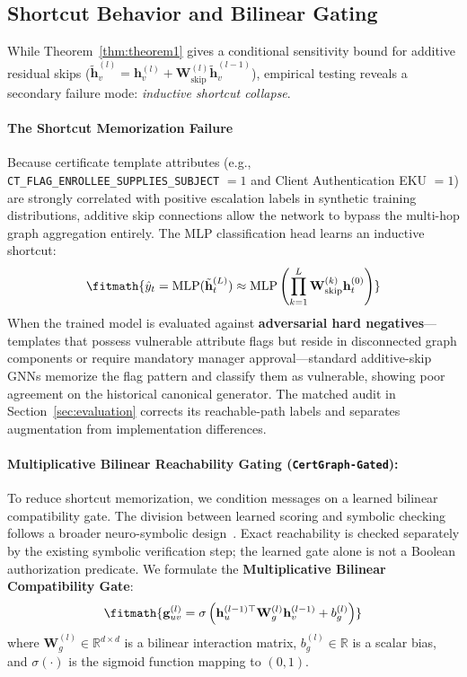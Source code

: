 \subsection{Shortcut Behavior and Bilinear Gating}
While Theorem~\ref{thm:theorem1} gives a conditional sensitivity bound for additive residual skips ($\tilde{\mathbf{h}}_v^{(l)} = \mathbf{h}_v^{(l)} + \mathbf{W}_{\text{skip}}^{(l)} \tilde{\mathbf{h}}_v^{(l-1)}$), empirical testing reveals a secondary failure mode: \textit{inductive shortcut collapse}.

\paragraph{The Shortcut Memorization Failure}
Because certificate template attributes (e.g., \texttt{CT\_FLAG\_ENROLLEE\_SUPPLIES\_SUBJECT} $= 1$ and Client Authentication EKU $= 1$) are strongly correlated with positive escalation labels in synthetic training distributions, additive skip connections allow the network to bypass the multi-hop graph aggregation entirely. The MLP classification head learns an inductive shortcut:
\begin{equation}
\fitmath{\hat{y}_t = \text{MLP}(\tilde{\mathbf{h}}_t^{(L)}) \approx \text{MLP} \left( \prod_{k=1}^L \mathbf{W}_{\text{skip}}^{(k)} \mathbf{h}_t^{(0)} \right)}
\end{equation}
When the trained model is evaluated against \textbf{adversarial hard negatives}—templates that possess vulnerable attribute flags but reside in disconnected graph components or require mandatory manager approval—standard additive-skip GNNs memorize the flag pattern and classify them as vulnerable, showing poor agreement on the historical canonical generator. The matched audit in Section~\ref{sec:evaluation} corrects its reachable-path labels and separates augmentation from implementation differences.

\paragraph{Multiplicative Bilinear Reachability Gating (\texttt{CertGraph-Gated}):}
To reduce shortcut memorization, we condition messages on a learned bilinear compatibility gate. The division between learned scoring and symbolic checking follows a broader neuro-symbolic design~\cite{garcez2023neurosymbolic}. Exact reachability is checked separately by the existing symbolic verification step; the learned gate alone is not a Boolean authorization predicate. We formulate the \textbf{Multiplicative Bilinear Compatibility Gate}:
\begin{equation}
\fitmath{\mathbf{g}_{uv}^{(l)} = \sigma \left( \mathbf{h}_u^{(l-1)\top} \mathbf{W}_g^{(l)} \mathbf{h}_v^{(l-1)} + b_g^{(l)} \right)}
\end{equation}
where $\mathbf{W}_g^{(l)} \in \mathbb{R}^{d \times d}$ is a bilinear interaction matrix, $b_g^{(l)} \in \mathbb{R}$ is a scalar bias, and $\sigma(\cdot)$ is the sigmoid function mapping to $(0, 1)$.

